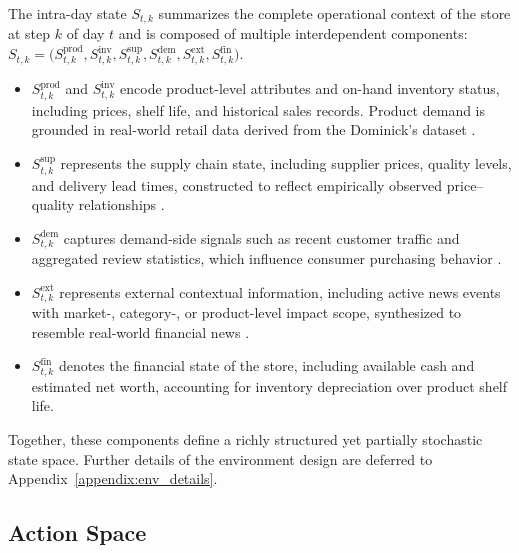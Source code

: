 The intra-day state $S_{t,k}$ summarizes the complete operational context of the store at step $k$ of day $t$ and is composed of multiple interdependent components:
$S_{t,k} = \big(
S_{t,k}^{\text{prod}},
S_{t,k}^{\text{inv}},
S_{t,k}^{\text{sup}},
S_{t,k}^{\text{dem}},
S_{t,k}^{\text{ext}},
S_{t,k}^{\text{fin}}
\big)$.
\begin{itemize}[leftmargin=*]
    \item $S_{t,k}^{\text{prod}}$ and $S_{t,k}^{\text{inv}}$ encode product-level attributes and on-hand inventory status, including prices, shelf life, and historical sales records. Product demand is grounded in real-world retail data derived from the Dominick’s dataset \citep{DominicksDataset}.
    \item $S_{t,k}^{\text{sup}}$ represents the supply chain state, including supplier prices, quality levels, and delivery lead times, constructed to reflect empirically observed price--quality relationships \citep{supplychain}.
    \item $S_{t,k}^{\text{dem}}$ captures demand-side signals such as recent customer traffic and aggregated review statistics, which influence consumer purchasing behavior \citep{Fedewa2021FiveStarGrowth}.
    \item $S_{t,k}^{\text{ext}}$ represents external contextual information, including active news events with market-, category-, or product-level impact scope, synthesized to resemble real-world financial news \citep{ashraq2025financialNewsArticles}.
    \item $S_{t,k}^{\text{fin}}$ denotes the financial state of the store, including available cash and estimated net worth, accounting for inventory depreciation over product shelf life.
\end{itemize}

Together, these components define a richly structured yet partially stochastic state space. Further details of the environment design are deferred to Appendix~\ref{appendix:env_details}.

\subsection{Action Space}

